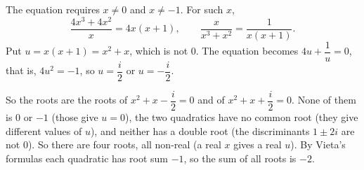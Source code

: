 The equation requires $x\ne0$ and $x\ne-1$. For such $x$,
\[\dfrac{4x^3+4x^2}{x}=4x(x+1),\qquad\dfrac{x}{x^3+x^2}=\dfrac{1}{x(x+1)}.\]
Put $u=x(x+1)=x^2+x$, which is not $0$. The equation becomes $4u+\dfrac1u=0$, that is, $4u^2=-1$, so $u=\dfrac i2$ or $u=-\dfrac i2$.

So the roots are the roots of $x^2+x-\dfrac i2=0$ and of $x^2+x+\dfrac i2=0$. None of them is $0$ or $-1$ (those give $u=0$), the two quadratics have no common root (they give different values of $u$), and neither has a double root (the discriminants $1\pm2i$ are not $0$). So there are four roots, all non-real (a real $x$ gives a real $u$). By Vieta's formulas each quadratic has root sum $-1$, so the sum of all roots is $\boxed{-2}$.
